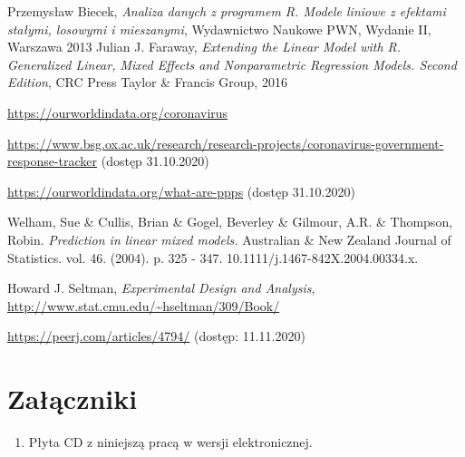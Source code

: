\documentclass[12pt]{mwbk}
\theoremstyle{plain}
\theoremstyle{definition}
\theoremstyle{remark}
\begin{document}
\begin{thebibliography}{99}



 Przemysław Biecek, \emph{Analiza danych z programem R. Modele liniowe z efektami stałymi, losowymi i mieszanymi}, Wydawnictwo Naukowe PWN, Wydanie II, Warszawa 2013
 Julian J. Faraway, \emph{Extending the Linear Model with R. Generalized Linear, Mixed Effects and Nonparametric Regression Models. Second Edition}, CRC Press Taylor \& Francis  Group, 2016

 \url{https://ourworldindata.org/coronavirus}

 \url{https://www.bsg.ox.ac.uk/research/research-projects/coronavirus-government-response-tracker} (dostęp 31.10.2020)

 \url{https://ourworldindata.org/what-are-ppps} (dostęp 31.10.2020)

 Welham, Sue \& Cullis, Brian \& Gogel, Beverley \& Gilmour, A.R. \& Thompson, Robin. \emph{Prediction in linear mixed models.} Australian \& New Zealand Journal of Statistics. vol. 46.  (2004). p.  325 - 347. 10.1111/j.1467-842X.2004.00334.x. 

 Howard J. Seltman, \emph{Experimental Design and Analysis}, \url{http://www.stat.cmu.edu/~hseltman/309/Book/}

 \url{https://peerj.com/articles/4794/} (dostęp: 11.11.2020)

\end{thebibliography}



\listoffigures

\listoftables


\chapter*{Załączniki}
\begin{enumerate}
\item Płyta CD z niniejszą pracą w wersji elektronicznej.
\end{enumerate}
\end{document}
